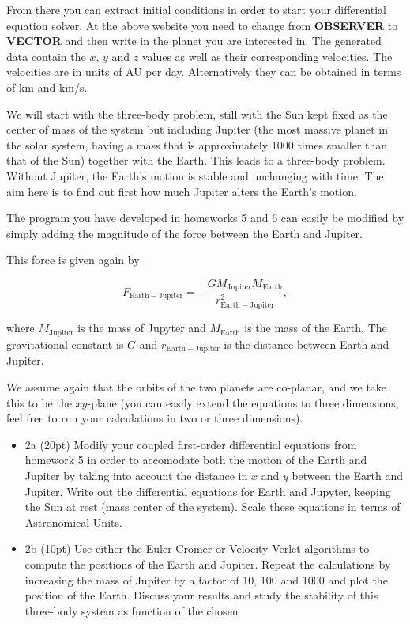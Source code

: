 \documentclass[%
oneside,                 %
final,                   %
10pt]{article}
\begin{document}
From there you can extract initial conditions in order to start your
differential equation solver.  At the above website you need to change
from \textbf{OBSERVER} to \textbf{VECTOR} and then write in the planet you are
interested in.  The generated data contain the $x$, $y$ and $z$ values
as well as their corresponding velocities. The velocities are in units
of AU per day.  Alternatively they can be obtained in terms of km and
km/s.

We will start with  the three-body problem, still with the Sun kept
fixed as the center of mass of the system but including Jupiter (the
most massive planet in the solar system, having a mass that is
approximately 1000 times smaller than that of the Sun) together with
the Earth. This leads to a three-body problem. Without Jupiter, the
Earth's motion is stable and unchanging with time. The aim here is to
find out first how much Jupiter alters the Earth's motion.


The program you have developed in homeworks 5 and 6 can easily be modified by
simply adding the magnitude of the force between the Earth and
Jupiter.

This force is given again by

\[
F_{\mathrm{Earth-Jupiter}}=-\frac{GM_{\mathrm{Jupiter}}M_{\mathrm{Earth}}}{r_{\mathrm{Earth-Jupiter}}^2},
\]

where $M_{\mathrm{Jupiter}}$ is the mass of Jupyter and
$M_{\mathrm{Earth}}$ is the mass of the Earth.  The gravitational constant
is $G$ and $r_{\mathrm{Earth-Jupiter}}$ is the distance between Earth
and Jupiter.

We assume again that the orbits of the two planets are co-planar, and
we take this to be the $xy$-plane (you can easily extend the equations
to three dimensions, feel free to run your calculations in two or three dimensions).

\begin{itemize}
\item 2a (20pt) Modify your coupled first-order differential equations from homework 5 in order to accomodate both the motion of the Earth and Jupiter by taking into account the distance in $x$ and $y$ between the Earth and Jupiter. Write out the differential equations for  Earth and Jupyter, keeping the Sun at rest (mass center of the system). Scale these equations in terms of Astronomical Units.

\item 2b (10pt) Use either the Euler-Cromer or Velocity-Verlet algorithms to compute the positions of the Earth and Jupiter. Repeat the calculations by increasing the mass of Jupiter by a factor of 10, 100 and 1000 and plot the position of the Earth.  Discuss your results and study the stability of this three-body system as function of the chosen
\end{itemize}
\end{document}
